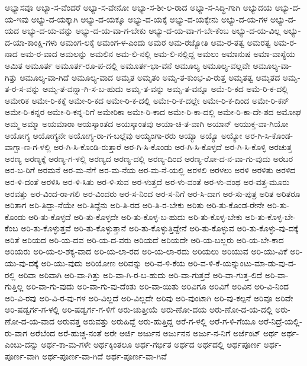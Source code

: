 {ಅಭ್ಯಾಸವೂ
ಅಭ್ಯಾ-ಸ-ವೆಂದರೆ
ಅಭ್ಯಾ-ಸ-ವೇನೋ
ಅಭ್ಯಾ-ಸ-ಶೀ-ಲ-ರಾದ
ಅಭ್ಯಾ-ಸ-ಸಿದ್ಧಿ-ಗಾಗಿ
ಅಭ್ಯುದಯ
ಅಭ್ಯು-ದ-ಯ-ಇವು
ಅಭ್ಯು-ದ-ಯಕ್ಕಾಗಿ
ಅಭ್ಯು-ದ-ಯಕ್ಕೂ
ಅಭ್ಯು-ದ-ಯಕ್ಕೆ
ಅಭ್ಯು-ದ-ಯಕ್ಕೇನು
ಅಭ್ಯು-ದ-ಯ-ಗಳ
ಅಭ್ಯು-ದ-ಯದ
ಅಭ್ಯು-ದ-ಯ-ವನ್ನು
ಅಭ್ಯು-ದ-ಯ-ವಾ-ಗ-ಬೇಕು
ಅಭ್ಯು-ದ-ಯ-ವಾ-ಗ-ಬೇ-ಕೆಂಬ
ಅಭ್ಯು-ದ-ಯ-ವಿಲ್ಲ
ಅಭ್ಯು-ದ-ಯಾ-ಕಾಂಕ್ಷಿ-ಗಳು
ಅಮಂಗ-ಲಕ್ಕೆ
ಅಮಂಗ-ಳ-ಎಂದು
ಅಮರ
ಅಮ-ರಜ್ಯೋತಿ
ಅಮ-ರ-ತತ್ವ
ಅಮರತ್ವ
ಅಮ-ರ-ನಾದ
ಅಮ-ರ-ವಾದ
ಅಮಲನ್ನು
ಅಮಲಿನ
ಅಮ-ಲಿ-ನಲ್ಲಿ
ಅಮ-ಲಿ-ನಲ್ಲಿದ್ದ
ಅಮಲು
ಅಮಾನುಷ
ಅಮಾ-ವಾಸ್ಯೆಯ
ಅಮಿತ
ಅಮೂರ್ತ
ಅಮೂರ್ತ-ರೂ-ಪ-ದಲ್ಲಿ
ಅಮೂರ್ತ-ಭಾ-ವನೆ
ಅಮೂಲ್ಯ
ಅಮೂಲ್ಯ-ವಲ್ಲವೇ
ಅಮೂಲ್ಯ-ವಾ-ಗಿತ್ತು
ಅಮೂಲ್ಯ-ವಾ-ಗಿದೆ
ಅಮೂಲ್ಯ-ವಾದ
ಅಮೃತ
ಅಮೃತಂ
ಅಮೃ-ತ-ಕುಂಭ-ವಿ-ರುತ್ತ
ಅಮೃತತ್ವ
ಅಮೃತದ
ಅಮೃ-ತ-ರ-ಸ-ವನ್ನು
ಅಮೃ-ತ-ವನ್ನಾ-ಗಿ-ಸ-ಬ-ಹುದು
ಅಮೃ-ತ-ವನ್ನು
ಅಮೃ-ತ-ವನ್ನೂ
ಅಮೆ-ರಿ-ಕದ
ಅಮೆ-ರಿ-ಕ-ದಲ್ಲಿ
ಅಮೇರಿಕ
ಅಮೇ-ರಿ-ಕಕ್ಕೆ
ಅಮೇ-ರಿ-ಕದ
ಅಮೇ-ರಿ-ಕ-ದಲ್ಲಿ
ಅಮೇ-ರಿ-ಕ-ದಲ್ಲೇ
ಅಮೇ-ರಿ-ಕ-ದಿಂದ
ಅಮೇ-ರಿ-ಕನ್
ಅಮೇ-ರಿ-ಕನ್ನರ
ಅಮೇ-ರಿ-ಕನ್ನ-ರಿಗೆ
ಅಮೇರಿಕಾ
ಅಮೇ-ರಿ-ಕಾದ
ಅಮೇ-ರಿ-ಕಾ-ದಲ್ಲಿ
ಅಮೇ-ರಿ-ಕಾ-ದೇ-ಶದ
ಅಮೋಘ
ಅಮ್ಮ
ಅಮ್ಮಾ
ಅಯಮಾರಾ
ಅಯಸ್ಕಾಂತದ
ಅಯಸ್ಕಾಂತವು
ಅಯಾ-ಚಿ-ತ-ವಾಗಿ
ಅಯಾನ್
ಅಯುಕ್ತ-ವಾ-ಗಿಯೋ
ಅಯೋಗ್ಯ
ಅಯೋಗ್ಯನೇ
ಅಯೋಗ್ಯ-ರಾ-ಗ-ಬಲ್ಲೆವು
ಅಯ್ಯಂಗಾ-ರರು
ಅಯ್ಯಾ
ಅಯ್ಯೊ
ಅಯ್ಯೋ
ಅರ-ಗಿ-ಸಿ-ಕೊಂಡ-ವಾಗ್ಬಾ-ಣ-ಗ-ಳಲ್ಲಿ
ಅರ-ಗಿ-ಸಿ-ಕೊಂಡಿ-ರುತ್ತಾರೆ
ಅರ-ಗಿ-ಸಿ-ಕೊಂಡು
ಅರ-ಗಿ-ಸಿ-ಕೊಳ್ಳದೆ
ಅರ-ಗಿ-ಸಿ-ಕೊಳ್ಳಿ
ಅರಚುತ್ತ
ಅರಣ್ಯ
ಅರಣ್ಯಕ್ಕೆ
ಅರಣ್ಯ-ಗ-ಳಲ್ಲಿ
ಅರಣ್ಯದ
ಅರಣ್ಯ-ದಲ್ಲಿ
ಅರಣ್ಯ-ದಿಂದ
ಅರಣ್ಯ-ರೋ-ದ-ನ-ವಾ-ಗು-ವುದು
ಅರಬರ
ಅರ-ಬ-ರಿಗೆ
ಅರಮನೆ
ಅರ-ಮ-ನೆಗೆ
ಅರ-ಮ-ನೆಯ
ಅರ-ಮ-ನೆ-ಯಲ್ಲಿ
ಅರಳಲಿ
ಅರಳಲು
ಅರಳಿ
ಅರಳಿತು
ಅರಳಿದ
ಅರ-ಳಿ-ದಂತೆ
ಅರಳಿಸಿ
ಅರ-ಳಿ-ಸಿತು
ಅರ-ಳಿ-ಸುವ
ಅರ-ಳುತ್ತದೆ
ಅರ-ಳು-ವಂತೆ
ಅರ-ಳು-ವಂಥ
ಅರ-ವತ್ತ-ಮೂರು
ಅರವತ್ತು
ಅರ-ವಿಂದ-ರಾ-ಗಲಿ
ಅರ-ವಿಂದರು
ಅರ-ಸ-ನಿಂದ
ಅರ-ಸ-ನಿಗೆ
ಅರ-ಸಿ-ದಾಗ
ಅರ-ಸು-ಪುತ್ರ
ಅರಿತ
ಅರಿತರೂ
ಅರಿತಾಗ
ಅರಿ-ತಿದ್ದಾ-ನೆಯೇ
ಅರಿ-ತಿದ್ದೆನು
ಅರಿ-ತಿ-ರದ
ಅರಿ-ತಿ-ರ-ಬೇಕು
ಅರಿತು
ಅರಿ-ತು-ಕೊಂಡ-ರೇನೇ
ಅರಿ-ತು-ಕೊಂಡು
ಅರಿ-ತು-ಕೊಳ್ಳದೆ
ಅರಿ-ತು-ಕೊಳ್ಳದೇ
ಅರಿ-ತು-ಕೊಳ್ಳ-ಬ-ಹುದು
ಅರಿ-ತು-ಕೊಳ್ಳ-ಬೇಕು
ಅರಿ-ತು-ಕೊಳ್ಳ-ಬೇ-ಕೆಂಬ
ಅರಿ-ತು-ಕೊಳ್ಳುತ್ತವೆ
ಅರಿ-ತು-ಕೊಳ್ಳುತ್ತಾನೆ
ಅರಿ-ತು-ಕೊಳ್ಳುತ್ತಿದ್ದೇನೆ
ಅರಿ-ತು-ಕೊಳ್ಳುವ
ಅರಿ-ತು-ಕೊಳ್ಳು-ವು-ದಕ್ಕೆ
ಅರಿತೆ
ಅರಿಯದ
ಅರಿ-ಯ-ದವ
ಅರಿ-ಯ-ದ-ವರು
ಅರಿಯದೆ
ಅರಿಯದೇ
ಅರಿ-ಯ-ಬಲ್ಲರು
ಅರಿ-ಯ-ಬೇ-ಕಾದ
ಅರಿಯರು
ಅರಿ-ಯ-ಲ-ಶಕ್ಯ-ವಾದ
ಅರಿ-ಯ-ಲಾ-ರದ
ಅರಿ-ಯ-ಲಾ-ರದು
ಅರಿಯಲು
ಅರಿಯುವ
ಅರಿ-ಯು-ವಿಕೆ
ಅರಿ-ಯು-ವು-ದಕ್ಕೆ
ಅರಿ-ಯು-ವುದು
ಅರಿಯೋಣ
ಅರಿವನ್ನು
ಅರಿ-ವ-ಳಿ-ಕೆಯ
ಅರಿ-ವ-ಳಿ-ಕೆ-ಯನ್ನುಂಟು-ಮಾ-ಡು-ವು-ದ-ರಲ್ಲಿ
ಅರಿವಾ
ಅರಿವಾಗಿ
ಅರಿ-ವಾ-ಗಿತ್ತು
ಅರಿ-ವಾ-ಗಿ-ರ-ಬ-ಹುದು
ಅರಿ-ವಾ-ಗುತ್ತದೆ
ಅರಿ-ವಾ-ಗುತ್ತ-ಲಿದೆ
ಅರಿ-ವಾ-ಗುತ್ತಿಲ್ಲ
ಅರಿ-ವಾ-ಗು-ವುದು
ಅರಿ-ವಾ-ಗು-ವು-ದೆಂತು
ಅರಿ-ವಾ-ಯಿತು
ಅರಿವಿಗೂ
ಅರಿವಿಗೆ
ಅರಿವಿನ
ಅರಿ-ವಿ-ನಿಂದ
ಅರಿ-ವಿ-ರವು
ಅರಿ-ವಿ-ರ-ವು-ಗಳ
ಅರಿ-ವಿಲ್ಲದೆ
ಅರಿ-ವಿಲ್ಲದೇ
ಅರಿವು
ಅರಿ-ವುಂಟಾಗಿ
ಅರಿ-ವು-ಕಲ್ಪನೆ
ಅರಿವೂ
ಅರಿವೇ
ಅರಿ-ಷಡ್ವರ್ಗ-ಗ-ಳಲ್ಲಿ
ಅರಿ-ಷಡ್ವರ್ಗ-ಗ-ಳಿಗೆ
ಅರು-ಚುತ್ತೀಯೆ
ಅರು-ಣೋ-ದಯ
ಅರು-ಣೋ-ದ-ಯ-ದಲ್ಲಿ
ಅರು-ಣೋ-ದ-ಯ-ವಾದ
ಅರುವತ್ತ
ಅರುವತ್ತು
ಅರುಹಿದ್ದೆ
ಅರು-ಹುತ್ತಿದ್ದ
ಅರೆ-ಗ-ಳಲ್ಲಿ
ಅರೆ-ಗ-ಳಿ-ಗೆಯೂ
ಅರೆ-ನಿದ್ರೆ-ಯಲ್ಲಿ-ರು-ವಾಗ
ಅರೆಬೆಂದ
ಅರೆ-ಹುಚ್ಚ-ನಂತೆ
ಅರೇ
ಅರ್ಜಿ
ಅರ್ಜುನ
ಅರ್ಜುನನ
ಅರ್ಜು-ನ-ನಿಗೆ
ಅರ್ಜೆಂಟ್
ಅರ್ಥ
ಅರ್ಥ-ಎಂಬು-ದನ್ನು
ಅರ್ಥ-ಕಾ-ಮ-ಗಳೇ
ಅರ್ಥಕ್ಕಿಂತಲೂ
ಅರ್ಥ-ಗರ್ಭಿತ
ಅರ್ಥದ
ಅರ್ಥದಲ್ಲಿ
ಅರ್ಥಪೂರ್ಣ
ಅರ್ಥ-ಪೂರ್ಣ-ವಾಗಿ
ಅರ್ಥ-ಪೂರ್ಣ-ವಾ-ಗಿದೆ
ಅರ್ಥ-ಪೂರ್ಣ-ವಾ-ಗಿವೆ
}
